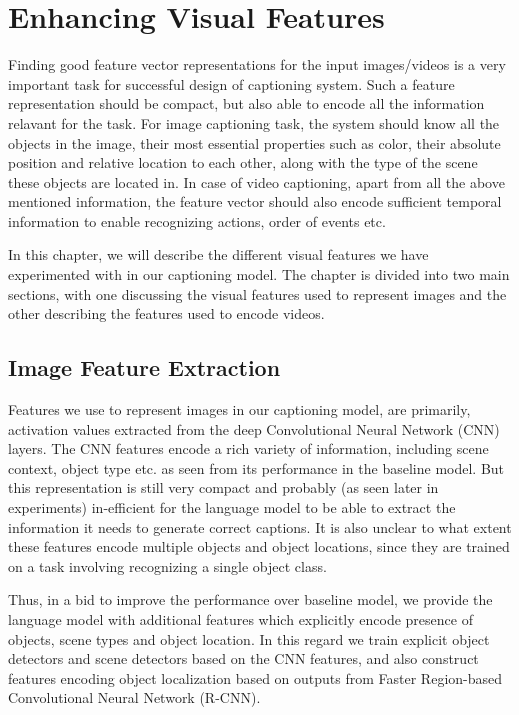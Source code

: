 \chapter{Enhancing Visual Features}
\label{chapter:VisFeatChapter}

Finding good feature vector representations for the input images/videos is a
very important task for successful design of captioning system.
Such a feature representation should be compact, but also able to encode all the
information relavant for the task. 
For image captioning task, the system should know all the objects in the image,
their most essential properties such as color, their absolute position and
relative location to each other, along with the type of the scene these objects
are located in.
In case of video captioning, apart from all the above mentioned information, the
feature vector should also encode sufficient temporal information to enable
recognizing actions, order of events etc.

In this chapter, we will describe the different visual features we have experimented with
in our captioning model.
The chapter is divided into two main sections, with one discussing the visual
features used to represent images and the other describing the features used to
encode videos.

\section{Image Feature Extraction}
\label{sec:ImageFeat}

Features we use to represent images in our captioning model, are primarily,
activation values extracted from the deep Convolutional Neural Network (CNN)
layers.
The CNN features encode a rich variety of information, including scene context,
object type etc. as seen from its performance in the baseline model.
But this representation is still very compact and probably (as seen later in
experiments) in-efficient for the language model to be able to extract the
information it needs to generate correct captions.
It is also unclear to what extent these features encode multiple objects and
object locations, since they are trained on a task involving recognizing a
single object class.

Thus, in a bid to improve the performance over baseline model, we provide the
language model with additional features which explicitly encode presence of
objects, scene types and object location.
In this regard we train explicit object detectors and scene detectors based on
the CNN features, and also construct features encoding object localization based
on outputs from Faster Region-based Convolutional Neural Network (R-CNN).
